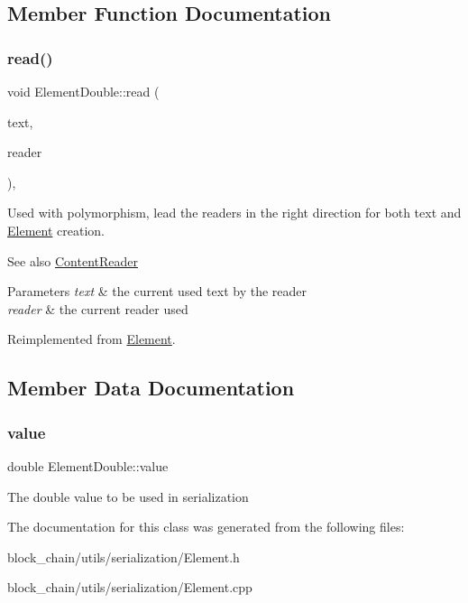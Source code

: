 \subsection{Member Function Documentation}
\mbox{\label{classElementDouble_a11bf3651edd2cbcdf04610b113accf90}} 
\subsubsection{\texorpdfstring{read()}{read()}}
{\footnotesize\ttfamily void Element\+Double\+::read (\begin{DoxyParamCaption}\item[{std\+::string \&}]{text,  }\item[{const \mbox{\hyperlink{classContentReader}{Content\+Reader}} $\ast$}]{reader }\end{DoxyParamCaption})\hspace{0.3cm}{\ttfamily [override]}, {\ttfamily [virtual]}}

Used with polymorphism, lead the readers in the right direction for both text and \mbox{\hyperlink{classElement}{Element}} creation. \begin{DoxySeeAlso}{See also}
\mbox{\hyperlink{classContentReader}{Content\+Reader}}
\end{DoxySeeAlso}

\begin{DoxyParams}{Parameters}
{\em text} & the current used text by the reader \\
\hline
{\em reader} & the current reader used \\
\hline
\end{DoxyParams}


Reimplemented from \mbox{\hyperlink{classElement_ab468bd37a9558f5227837a9236bc9e4b}{Element}}.



\subsection{Member Data Documentation}
\mbox{\label{classElementDouble_aa04fa64c846076944151db147bcaaa1f}} 
\subsubsection{\texorpdfstring{value}{value}}
{\footnotesize\ttfamily double Element\+Double\+::value}

The double value to be used in serialization 

The documentation for this class was generated from the following files\+:\begin{DoxyCompactItemize}
\item 
block\+\_\+chain/utils/serialization/Element.\+h\item 
block\+\_\+chain/utils/serialization/Element.\+cpp\end{DoxyCompactItemize}
